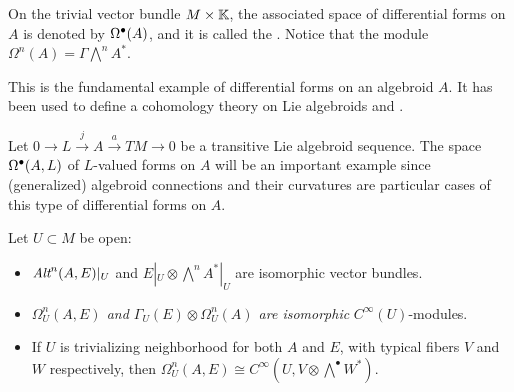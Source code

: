 \lin



\begin{example}
On the trivial vector bundle $M \times \mathbb{K}$, the associated space of differential forms on $A$ is denoted by $\textcolor{black}{\textcolor{black}{\Omega^\bullet(A)}}$, and it is called the . Notice that the module $\Omega^n(A) = \Gamma \bigwedge^n A^*$.

\noindent This is the fundamental example of differential forms on an algebroid $A$. It has been used to define a cohomology theory on Lie algebroids and .
\end{example}

\begin{example}
Let $0 \to L \xrightarrow{j} A \xrightarrow{a} TM \to 0$ be a transitive Lie algebroid sequence.
The space $\textcolor{black}{\Omega^\bullet(A, L)}$ of $L$-valued forms on $A$ will be an important example since (generalized) algebroid connections and their curvatures are particular cases of this type of differential forms on $A$.
\end{example}

\lin

\begin{proposition}\label{propositionIsomorphOmegas}
Let $U\subset M$ be open:
    \begin{itemize}
    
    \item $\operatorname{\textit{Alt}}^n(A, E)|_U$ and $E|_U \otimes \bigwedge^n A^*|_U$ are isomorphic vector bundles.
    
    
    \item \textit{$\Omega_U^n(A, E)$ and $\Gamma_U(E) \otimes \Omega_U^n(A)$ are isomorphic} $C^\infty(U)$-modules.
    
    \item If $U$ is trivializing neighborhood for both $A$ and $E$, with typical fibers $V$ and $W$ respectively, then $\Omega_U^n(A, E) \cong C^\infty(U, V \otimes \bigwedge^\bullet W^*)$.
    
    
    \end{itemize}
\end{proposition}

